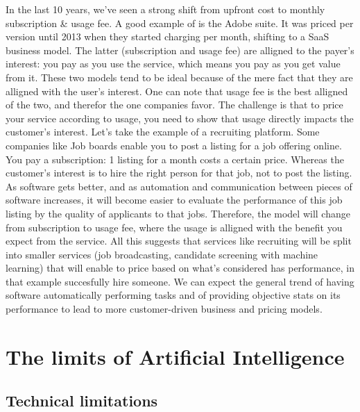 \documentclass[12pt]{article}
\begin{document}
 In the last 10 years, we've seen a strong shift from upfront cost to monthly
subscription \& usage fee. A good example of is the Adobe suite. It was priced
per version until 2013 when they started charging per month, shifting to a SaaS
business model. The latter (subscription and usage fee) are alligned to the
payer's interest: you pay as you use the service, which means you pay as you
get value from it. These two models tend to be ideal because of the mere fact
that they are alligned with the user's interest. One can note that usage fee is
the best alligned of the two, and therefor the one companies favor. The
challenge is that to price your service according to usage, you need to show
that usage directly impacts the customer's interest. Let's take the example of
a recruiting platform. Some companies like Job boards enable you to post a
listing for a job offering online. You pay a subscription: 1 listing for a
month costs a certain price. Whereas the customer's interest is to hire the
right person for that job, not to post the listing. As software gets better,
and as automation and communication between pieces of software increases, it
will become easier to evaluate the performance of this job listing by the
quality of applicants to that jobs. Therefore, the model will change from
subscription to usage fee, where the usage is alligned with the benefit you
expect from the service. All this suggests that services like recruiting will
be split into smaller services (job broadcasting, candidate screening with
machine learning) that will enable to price based on what's considered has
performance, in that example succesfully hire someone. We can expect the
general trend of having software automatically performing tasks and of
providing objective stats on its performance to lead to more customer-driven
business and pricing models.

\pagebreak


\section{The limits of Artificial Intelligence}

\subsection{Technical limitations}
\end{document}
